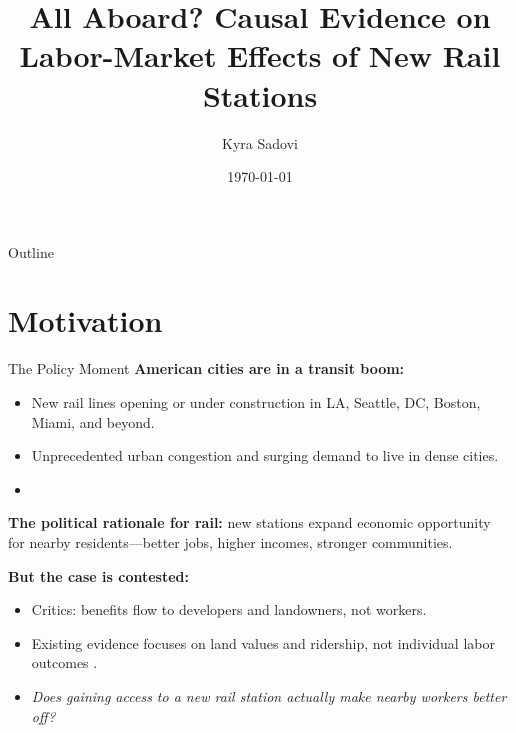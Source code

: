 \documentclass{beamer}
\title[New Rail Stations and Labor Markets]{All Aboard? Causal Evidence on\\Labor-Market Effects of New Rail Stations}
\author{Kyra Sadovi}
\institute{University of Chicago Harris School of Public Policy \\
\href{mailto:ksadovi@uchicago.edu}{ksadovi@uchicago.edu}}
\date{\today}
\begin{document}

\begin{frame}[plain]
  \titlepage
\end{frame}

\begin{frame}[plain]{Outline}
  \tableofcontents
\end{frame}

\section{Motivation}

\begin{frame}{The Policy Moment}
\small
\textbf{American cities are in a transit boom:}
\begin{itemize}
    \item New rail lines opening or under construction in LA, Seattle, DC, Boston, Miami, and beyond.
    \item Unprecedented urban congestion and surging demand to live in dense cities.
    \item %
\end{itemize}

\medskip
\textbf{The political rationale for rail:} new stations expand economic opportunity for
nearby residents---better jobs, higher incomes, stronger communities.

\medskip
\textbf{But the case is contested:}
\begin{itemize}
    \item Critics: benefits flow to developers and landowners, not workers.
    \item Existing evidence focuses on land values and ridership, not individual labor outcomes
          \parencite{mcmillen_reaction_2004}.
    \item \textit{Does gaining access to a new rail station actually make nearby workers better off?}
\end{itemize}
\end{frame}
\end{document}

